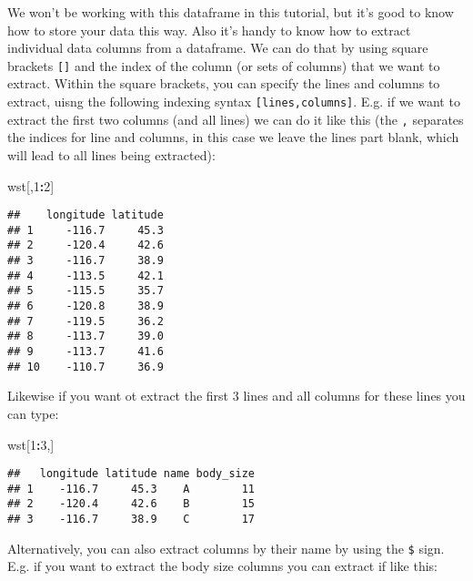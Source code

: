 \documentclass[]{article}
\newenvironment{Shaded}{\begin{snugshade}}{\end{snugshade}}
\newcommand{\DecValTok}[1]{\textcolor[rgb]{0.00,0.00,0.81}{#1}}
\newcommand{\NormalTok}[1]{#1}
\newcommand{\OperatorTok}[1]{\textcolor[rgb]{0.81,0.36,0.00}{\textbf{#1}}}
\begin{document}
We won't be working with this dataframe in this tutorial, but it's good
to know how to store your data this way. Also it's handy to know how to
extract individual data columns from a dataframe. We can do that by
using square brackets \texttt{{[}{]}} and the index of the column (or
sets of columns) that we want to extract. Within the square brackets,
you can specify the lines and columns to extract, uisng the following
indexing syntax \texttt{{[}lines,columns{]}}. E.g. if we want to extract
the first two columns (and all lines) we can do it like this (the
\texttt{,} separates the indices for line and columns, in this case we
leave the lines part blank, which will lead to all lines being
extracted):

\begin{Shaded}
\begin{Highlighting}[]
\NormalTok{wst[,}\DecValTok{1}\OperatorTok{:}\DecValTok{2}\NormalTok{]}
\end{Highlighting}
\end{Shaded}

\begin{verbatim}
##    longitude latitude
## 1     -116.7     45.3
## 2     -120.4     42.6
## 3     -116.7     38.9
## 4     -113.5     42.1
## 5     -115.5     35.7
## 6     -120.8     38.9
## 7     -119.5     36.2
## 8     -113.7     39.0
## 9     -113.7     41.6
## 10    -110.7     36.9
\end{verbatim}

Likewise if you want ot extract the first 3 lines and all columns for
these lines you can type:

\begin{Shaded}
\begin{Highlighting}[]
\NormalTok{wst[}\DecValTok{1}\OperatorTok{:}\DecValTok{3}\NormalTok{,]}
\end{Highlighting}
\end{Shaded}

\begin{verbatim}
##   longitude latitude name body_size
## 1    -116.7     45.3    A        11
## 2    -120.4     42.6    B        15
## 3    -116.7     38.9    C        17
\end{verbatim}

Alternatively, you can also extract columns by their name by using the
\texttt{\$} sign. E.g. if you want to extract the body size columns you
can extract if like this:

\begin{Shaded}
\end{Shaded}
\end{document}
